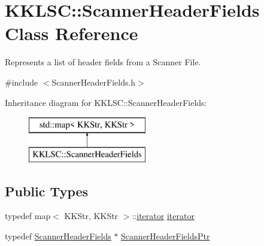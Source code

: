 \hypertarget{class_k_k_l_s_c_1_1_scanner_header_fields}{}\section{K\+K\+L\+SC\+:\+:Scanner\+Header\+Fields Class Reference}
\label{class_k_k_l_s_c_1_1_scanner_header_fields}


Represents a list of header fields from a Scanner File.  




{\ttfamily \#include $<$Scanner\+Header\+Fields.\+h$>$}

Inheritance diagram for K\+K\+L\+SC\+:\+:Scanner\+Header\+Fields\+:\begin{figure}[H]
\begin{center}
\leavevmode
\includegraphics[height=2.000000cm]{class_k_k_l_s_c_1_1_scanner_header_fields}
\end{center}
\end{figure}
\subsection*{Public Types}
\begin{DoxyCompactItemize}
\item 
typedef map$<$ K\+K\+Str, K\+K\+Str $>$\+::\hyperlink{class_k_k_l_s_c_1_1_scanner_header_fields_a0535c3aa5fbe6b53221ca0f188762402}{iterator} \hyperlink{class_k_k_l_s_c_1_1_scanner_header_fields_a0535c3aa5fbe6b53221ca0f188762402}{iterator}
\item 
typedef \hyperlink{class_k_k_l_s_c_1_1_scanner_header_fields}{Scanner\+Header\+Fields} $\ast$ \hyperlink{class_k_k_l_s_c_1_1_scanner_header_fields_aedddcdf8b705aada0dd2c52cb6624c59}{Scanner\+Header\+Fields\+Ptr}
\end{DoxyCompactItemize}
